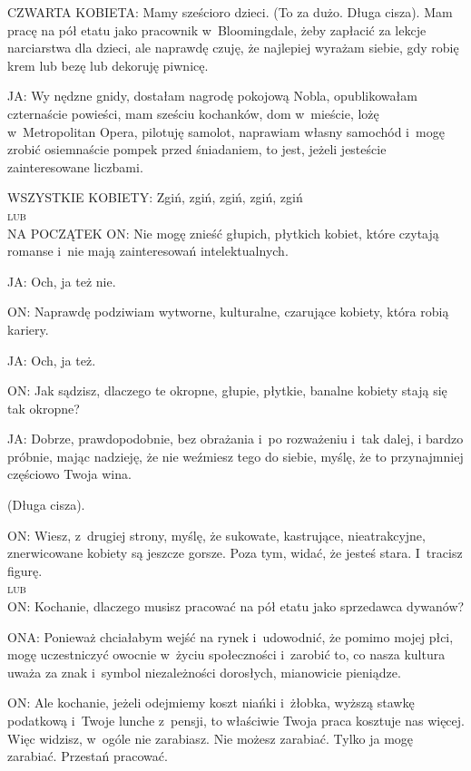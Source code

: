 \documentclass[oneside,polish,12pt,sfheadings]{mwbk}
\begin{document}
CZWARTA KOBIETA: Mamy sześcioro dzieci. (To za dużo. Długa cisza).
Mam pracę na pół etatu jako pracownik w~Bloomingdale, żeby zapłacić
za lekcje narciarstwa dla dzieci, ale naprawdę czuję, że najlepiej
wyrażam siebie, gdy robię krem lub bezę lub dekoruję piwnicę.

JA: Wy nędzne gnidy, dostałam nagrodę pokojową Nobla, opublikowałam
czternaście powieści, mam sześciu kochanków, dom w~mieście, lożę w~Metropolitan Opera, pilotuję samolot, naprawiam własny samochód i~mogę zrobić osiemnaście pompek przed śniadaniem, to jest, jeżeli jesteście
zainteresowane liczbami.

WSZYSTKIE KOBIETY: Zgiń, zgiń, zgiń, zgiń, zgiń \\

\textsc{lub}\\

NA POCZĄTEK ON:
Nie mogę znieść głupich, płytkich kobiet, które czytają romanse i~nie mają zainteresowań intelektualnych.

JA: Och, ja też nie.

ON: Naprawdę podziwiam wytworne, kulturalne, czarujące kobiety, która
robią kariery.

JA: Och, ja też.

ON: Jak sądzisz, dlaczego te okropne, głupie, płytkie, banalne kobiety
stają się tak okropne?

JA: Dobrze, prawdopodobnie, bez obrażania i~po rozważeniu i~tak dalej,
i bardzo próbnie, mając nadzieję, że nie weźmiesz tego do siebie,
myślę, że to przynajmniej częściowo Twoja wina.

(Długa cisza).

ON: Wiesz, z~drugiej strony, myślę, że sukowate, kastrujące, nieatrakcyjne,
znerwicowane kobiety są jeszcze gorsze. Poza tym, widać, że jesteś
stara. I~tracisz figurę.\\

\textsc{lub}\\

ON: Kochanie, dlaczego musisz pracować na pół etatu jako sprzedawca
dywanów?

ONA: Ponieważ chciałabym wejść na rynek i~udowodnić, że pomimo mojej
płci, mogę uczestniczyć owocnie w~życiu społeczności i~zarobić to,
co nasza kultura uważa za znak i~symbol niezależności dorosłych, mianowicie
pieniądze.

ON: Ale kochanie, jeżeli odejmiemy koszt niańki i~żłobka, wyższą stawkę
podatkową i~Twoje lunche z~pensji, to właściwie Twoja praca kosztuje
nas więcej. Więc widzisz, w~ogóle nie zarabiasz. Nie możesz zarabiać.
Tylko ja mogę zarabiać. Przestań pracować.
\end{document}
